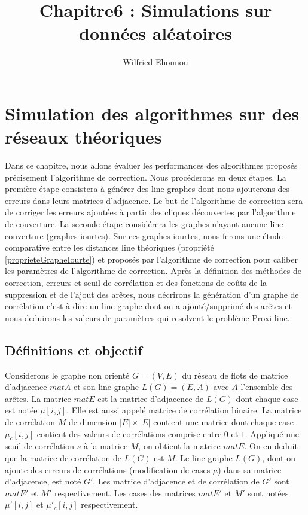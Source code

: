 \documentclass[onecolumn, 12pt]{book}
\title{Chapitre6 : Simulations sur donn\'ees al\'eatoires}
\author{Wilfried Ehounou}
\date{\oldstylenums{\today}}
\begin{document}
\maketitle
\tableofcontents

\chapter{Simulation des algorithmes sur des r\'eseaux th\'eoriques}
Dans ce chapitre, nous allons \'evaluer les performances des algorithmes propos\'es pr\'ecisement l'algorithme de correction. Nous proc\'ederons en deux \'etapes. 
La premi\`ere \'etape consistera  \`a g\'en\'erer des line-graphes dont nous ajouterons des erreurs dans leurs matrices d'adjacence. Le but de l'algorithme de correction sera de corriger les erreurs ajout\'ees \`a partir des cliques d\'ecouvertes par l'algorithme de couverture. 
La seconde \'etape consid\'erera les graphes n'ayant aucune line-couverture (graphes iourtes). Sur ces graphes iourtes, nous ferons  une \'etude comparative entre les distances line th\'eoriques (propri\'et\'e \ref{proprieteGrapheIourte}) et propos\'es par l'algorithme de correction pour caliber les param\`etres de l'algorithme de correction. \newline
Apr\`es la d\'efinition des m\'ethodes de correction, erreurs et seuil de corr\'elation et des fonctions de co\^uts de la suppression et de l'ajout des ar\^etes, nous d\'ecrirons la g\'en\'eration d'un graphe de corr\'elation c'est-\`a-dire un line-graphe dont on a ajout\'e/supprim\'e des ar\^etes et nous deduirons les valeurs de param\`etres qui resolvent le probl\`eme Proxi-line. 

\section{D\'efinitions et objectif}
Considerons le graphe non orient\'e $G = (V,E)$ du r\'eseau de flots de matrice d'adjacence $matA$ et son line-graphe $L(G) = (E, A)$ avec $A$ l'ensemble des ar\^etes.
La matrice $matE$ est la matrice d'adjacence de $L(G)$ dont chaque case est not\'ee $\mu[i,j]$. Elle est aussi appel\'e matrice de corr\'elation binaire.
La matrice de corr\'elation $M$ de dimension $|E| \times |E|$ contient une matrice dont chaque case $\mu_c[i,j]$ contient des valeurs de corr\'elations comprise entre $0$ et $1$. 
Appliqu\'e une seuil de corr\'elation  $s$ \`a la matrice $M$, on obtient la matrice $matE$. On en deduit que la matrice de corr\'elation de $L(G)$ est $M$. \newline
Le line-graphe $L(G)$, dont on ajoute des erreurs de corr\'elations (modification de cases $\mu$) dans sa matrice d'adjacence, est not\'e $G'$. Les matrice d'adjacence et de corr\'elation de $G'$ sont $matE'$ et $M'$ respectivement. Les cases des matrices $matE'$ et $M'$ sont not\'ees  $\mu'[i,j]$ et $\mu'_c[i,j]$ respectivement.
 
\end{document}
